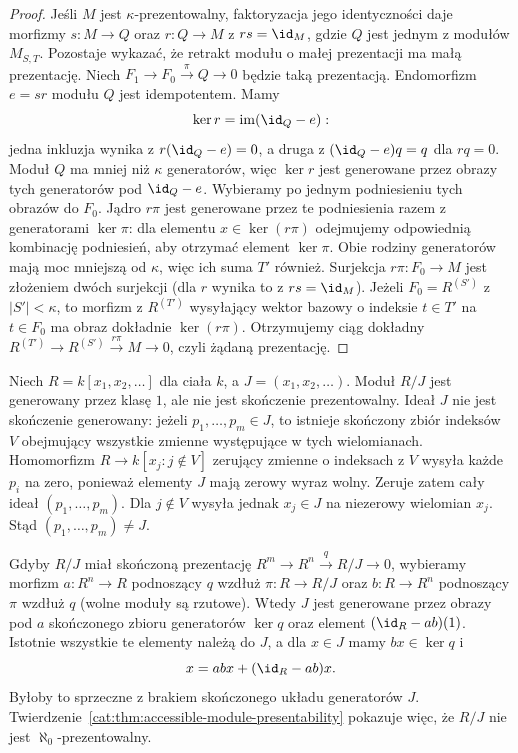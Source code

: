 \begin{proof}
Jeśli $M$ jest $\kappa$-prezentowalny, faktoryzacja jego identyczności daje morfizmy $s:M\to Q$ oraz $r:Q\to M$ z $rs=\id_M$, gdzie $Q$ jest jednym z modułów $M_{S,T}$. Pozostaje wykazać, że retrakt modułu o małej prezentacji ma małą prezentację. Niech $F_1\to F_0\xrightarrow{\pi}Q\to0$ będzie taką prezentacją. Endomorfizm $e=sr$ modułu $Q$ jest idempotentem. Mamy
\[
 \ker r=\operatorname{im}(\id_Q-e):
\]
jedna inkluzja wynika z $r(\id_Q-e)=0$, a druga z $(\id_Q-e)q=q$ dla $rq=0$. Moduł $Q$ ma mniej niż $\kappa$ generatorów, więc $\ker r$ jest generowane przez obrazy tych generatorów pod $\id_Q-e$. Wybieramy po jednym podniesieniu tych obrazów do $F_0$. Jądro $r\pi$ jest generowane przez te podniesienia razem z generatorami $\ker\pi$: dla elementu $x\in\ker(r\pi)$ odejmujemy odpowiednią kombinację podniesień, aby otrzymać element $\ker\pi$. Obie rodziny generatorów mają moc mniejszą od $\kappa$, więc ich suma $T'$ również. Surjekcja $r\pi:F_0\to M$ jest złożeniem dwóch surjekcji (dla $r$ wynika to z $rs=\id_M$). Jeżeli $F_0=R^{(S')}$ z $|S'|<\kappa$, to morfizm z $R^{(T')}$ wysyłający wektor bazowy o indeksie $t\in T'$ na $t\in F_0$ ma obraz dokładnie $\ker(r\pi)$. Otrzymujemy ciąg dokładny $R^{(T')}\to R^{(S')}\xrightarrow{r\pi}M\to0$, czyli żądaną prezentację.
\end{proof}

\begin{przyklad}\label{cat:ex:accessible-fg-not-fp}
Niech $R=k[x_1,x_2,\ldots]$ dla ciała $k$, a $J=(x_1,x_2,\ldots)$. Moduł $R/J$ jest generowany przez klasę $1$, ale nie jest skończenie prezentowalny. Ideał $J$ nie jest skończenie generowany: jeżeli $p_1,\ldots,p_m\in J$, to istnieje skończony zbiór indeksów $V$ obejmujący wszystkie zmienne występujące w tych wielomianach. Homomorfizm $R\to k[x_j:j\notin V]$ zerujący zmienne o indeksach z $V$ wysyła każde $p_i$ na zero, ponieważ elementy $J$ mają zerowy wyraz wolny. Zeruje zatem cały ideał $(p_1,\ldots,p_m)$. Dla $j\notin V$ wysyła jednak $x_j\in J$ na niezerowy wielomian $x_j$. Stąd $(p_1,\ldots,p_m)\ne J$.

Gdyby $R/J$ miał skończoną prezentację $R^m\to R^n\xrightarrow{q}R/J\to0$, wybieramy morfizm $a:R^n\to R$ podnoszący $q$ wzdłuż $\pi:R\to R/J$ oraz $b:R\to R^n$ podnoszący $\pi$ wzdłuż $q$ (wolne moduły są rzutowe). Wtedy $J$ jest generowane przez obrazy pod $a$ skończonego zbioru generatorów $\ker q$ oraz element $(\id_R-ab)(1)$. Istotnie wszystkie te elementy należą do $J$, a dla $x\in J$ mamy $bx\in\ker q$ i
\[
 x=abx+(\id_R-ab)x.
\]
Byłoby to sprzeczne z brakiem skończonego układu generatorów $J$. Twierdzenie~\ref{cat:thm:accessible-module-presentability} pokazuje więc, że $R/J$ nie jest $\aleph_0$-prezentowalny.
\end{przyklad}

